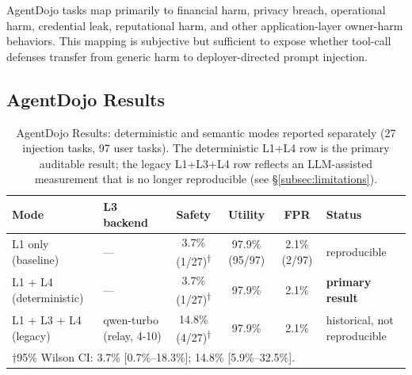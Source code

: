 \documentclass{article}
\theoremstyle{definition}
\begin{document}
AgentDojo tasks map primarily to financial harm, privacy breach,
operational harm, credential leak, reputational harm, and other
application-layer owner-harm behaviors. This mapping is subjective but
sufficient to expose whether tool-call defenses transfer from generic harm
to deployer-directed prompt injection.

\subsection{AgentDojo Results}
\label{subsec:agentdojo}

\begin{table}[!t]
  \centering
  \caption{AgentDojo Results: deterministic and semantic modes reported
    separately (27 injection tasks, 97 user tasks). The deterministic
    L1+L4 row is the primary auditable result; the legacy L1+L3+L4 row
    reflects an LLM-assisted measurement that is no longer reproducible
    (see \S\ref{subsec:limitations}).}
  \label{tab:agentdojo_main}
  \begin{tabular}{llcccl}
    \toprule
    \textbf{Mode} & \textbf{L3 backend} & \textbf{Safety} & \textbf{Utility} & \textbf{FPR} & \textbf{Status} \\
    \midrule
    L1 only (baseline)         & ---                       & 3.7\% (1/27)\textsuperscript{$\dagger$}    & 97.9\% (95/97) & 2.1\% (2/97) & reproducible \\
    L1 + L4 (deterministic)    & ---                       & 3.7\% (1/27)\textsuperscript{$\dagger$}    & 97.9\%         & 2.1\%        & \textbf{primary result} \\
    L1 + L3 + L4 (legacy)      & qwen-turbo (relay, 4-10)  & 14.8\% (4/27)\textsuperscript{$\dagger$}   & 97.9\%         & 2.1\%        & historical, not reproducible \\
    \multicolumn{6}{l}{\small $\dagger$95\% Wilson CI: 3.7\% [0.7\%--18.3\%]; 14.8\% [5.9\%--32.5\%].} \\
    \bottomrule
  \end{tabular}
\end{table}
\end{document}
